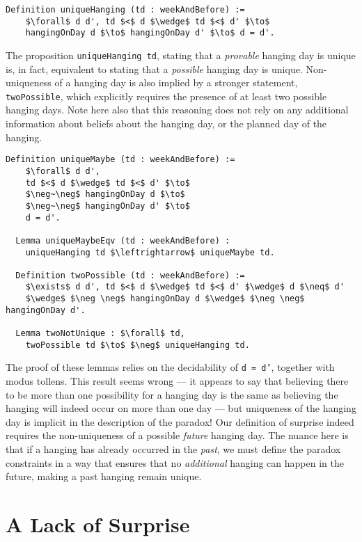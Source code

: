 \documentclass[runningheads]{llncs}
\begin{document}
\begin{lstlisting}[mathescape=true]
  Definition uniqueHanging (td : weekAndBefore) :=
    $\forall$ d d', td $<$ d $\wedge$ td $<$ d' $\to$
    hangingOnDay d $\to$ hangingOnDay d' $\to$ d = d'.
\end{lstlisting}

The proposition {\tt uniqueHanging td}, stating that
a \emph{provable} hanging day is unique is, in fact, equivalent to stating
that a \emph{possible} hanging day is unique. Non-uniqueness of a hanging day
is also implied by a stronger statement, {\tt twoPossible}, which explicitly
requires the presence of at least two possible hanging days.
Note here also that this reasoning does not rely on any additional information about
beliefs about the hanging day, or the planned day of the hanging.

\begin{lstlisting}[mathescape=true]
  Definition uniqueMaybe (td : weekAndBefore) :=
    $\forall$ d d',
    td $<$ d $\wedge$ td $<$ d' $\to$
    $\neg~\neg$ hangingOnDay d $\to$
    $\neg~\neg$ hangingOnDay d' $\to$
    d = d'.

  Lemma uniqueMaybeEqv (td : weekAndBefore) :
    uniqueHanging td $\leftrightarrow$ uniqueMaybe td.

  Definition twoPossible (td : weekAndBefore) :=
    $\exists$ d d', td $<$ d $\wedge$ td $<$ d' $\wedge$ d $\neq$ d'
    $\wedge$ $\neg \neg$ hangingOnDay d $\wedge$ $\neg \neg$ hangingOnDay d'.

  Lemma twoNotUnique : $\forall$ td,
    twoPossible td $\to$ $\neg$ uniqueHanging td.
\end{lstlisting}

The proof of these lemmas relies on the decidability of
{\tt d = d'}, together with modus tollens. This result seems wrong --- it appears to
say that believing there to be more than one possibility for a hanging day
is the same as believing the hanging will indeed occur on more than one day --- but
uniqueness of the hanging day is implicit in the description of the paradox!
Our definition of
surprise indeed requires the non-uniqueness of a possible \emph{future} hanging
day. The nuance here is that if a hanging
has already occurred in the \emph{past}, we must define the paradox constraints
in a way that ensures that no \emph{additional} hanging can happen in the future,
making a past hanging remain unique.

\section{A Lack of Surprise}
\label{sec:lack}
\end{document}
